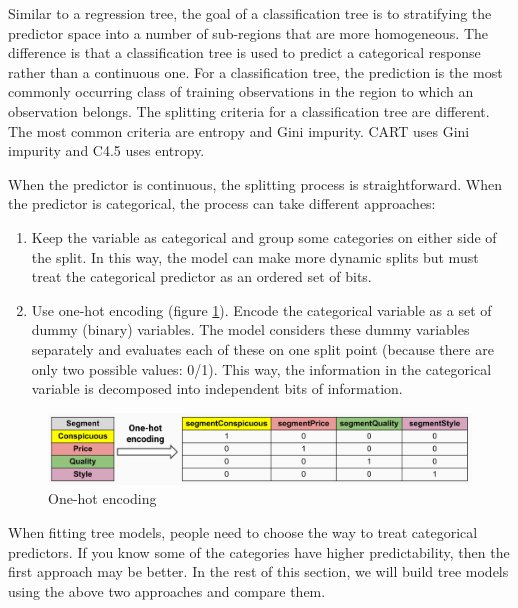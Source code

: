 \documentclass[
  12pt,
]{krantz}
\providecommand{\tightlist}{%
  \setlength{\itemsep}{0pt}\setlength{\parskip}{0pt}}
\begin{document}
Similar to a regression tree, the goal of a classification tree is to stratifying the predictor space into a number of sub-regions that are more homogeneous. The difference is that a classification tree is used to predict a categorical response rather than a continuous one. For a classification tree, the prediction is the most commonly occurring class of training observations in the region to which an observation belongs. The splitting criteria for a classification tree are different. The most common criteria are entropy and Gini impurity. CART uses Gini impurity and C4.5 uses entropy.

When the predictor is continuous, the splitting process is straightforward. When the predictor is categorical, the process can take different approaches:

\begin{enumerate}
\def\labelenumi{\arabic{enumi}.}
\tightlist
\item
  Keep the variable as categorical and group some categories on either side of the split. In this way, the model can make more dynamic splits but must treat the categorical predictor as an ordered set of bits.
\item
  Use one-hot encoding (figure \ref{fig:onehotencoding}). Encode the categorical variable as a set of dummy (binary) variables. The model considers these dummy variables separately and evaluates each of these on one split point (because there are only two possible values: 0/1). This way, the information in the categorical variable is decomposed into independent bits of information.
\end{enumerate}

\begin{figure}

{\centering \includegraphics[width=1\linewidth]{images/one_hot_encoding} 

}

\caption{One-hot encoding}\label{fig:onehotencoding}
\end{figure}

When fitting tree models, people need to choose the way to treat categorical predictors. If you know some of the categories have higher predictability, then the first approach may be better. In the rest of this section, we will build tree models using the above two approaches and compare them.
\end{document}
